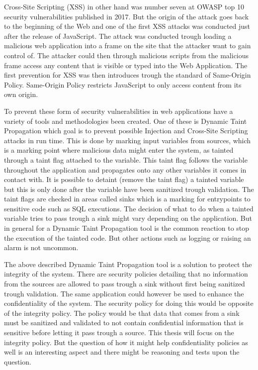 \documentclass{../kththesis}
\begin{document}
Cross-Site Scripting (XSS) in other hand was number seven at OWASP top 10 security vulnerabilities published in 2017. \parencite{OWASP2017} But the origin of the attack goes back to the beginning of the Web and one of the first XSS attacks was conducted just after the release of JavaScript. The attack was conducted trough loading a malicious web application into a frame on the site that the attacker want to gain control of. The attacker could then through malicious scripts from the malicious frame access any content that is visible or typed into the Web Application. The first prevention for XSS was then introduces trough the standard of Same-Origin Policy. Same-Origin Policy restricts JavaScript to only access content from its own origin. \parencite{FogieSeth2007Xacs, w3csop} 

To prevent these form of security vulnerabilities in web applications have a variety of tools and methodologies been created. One of these is Dynamic Taint Propagation which goal is to prevent possible Injection and Cross-Site Scripting attacks in run time. This is done by marking input variables from sources, which is a marking point where malicious data might enter the system, as tainted through a taint flag attached to the variable. This taint flag follows the variable throughout the application and propagates onto any other variables it comes in contact with. It is possible to detaint (remove the taint flag) a tainted variable but this is only done after the variable have been sanitized trough validation. The taint flags are checked in areas called sinks which is a marking for entrypoints to sensitive code such as SQL executions. \parencite{Pan2015, Venkataramani2008} The decision of what to do when a tainted variable tries to pass trough a sink might vary depending on the application. But in general for a Dynamic Taint Propagation tool is the common reaction to stop the execution of the tainted code. But other actions such as logging or raising an alarm is not uncommon. 

The above described Dynamic Taint Propagation tool is a solution to protect the integrity of the system. There are security policies detailing that no information from the sources are allowed to pass trough a sink without first being sanitized trough validation. The same application could however be used to enhance the confidentiality of the system. The security policy for doing this would be opposite of the integrity policy. The policy would be that data that comes from a sink must be sanitized and validated to not contain confidential information that is sensitive before letting it pass trough a source. This thesis will focus on the integrity policy. But the question of how it might help confidentiality policies as well is an interesting aspect and there might be reasoning and tests upon the question.
\end{document}

